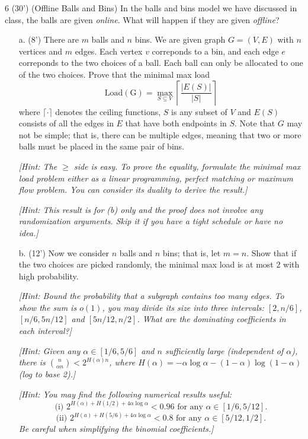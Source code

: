 
\begin{question}{6 (30') (Offline Balls and Bins)}    
In the balls and bins model we have discussed in class, the balls are given \textit{online}. What will happen if they are given \textit{offline}?
\begin{itemize}
    \item [a. (8') ] There are $m$ balls and $n$ bins. We are given graph $G=(V,E)$ with $n$ vertices and $m$ edges. Each vertex $v$ correponds to a bin, and each edge $e$ correponds to the two choices of a ball. Each ball can only be allocated to one of the two choices. Prove that the minimal max load
    $$\operatorname{Load(G)}=\max_{S\subseteq V}\left\lceil\frac{|E(S)|}{|S|}\right\rceil$$
    where $\lceil\cdot\rceil$ denotes the ceiling functions, $S$ is any subset of $V$ and $E(S)$ consists of all the edges in $E$ that have both endpoints in $S$.
    Note that $G$ may not be simple; that is, there can be multiple edges, meaning that two or more balls must be placed in the same pair of bins.

    \textit{[Hint: The $\geq$ side is easy. To prove the equality, formulate the minimal max load problem either as a linear programming, perfect matching or maximum flow problem. You can consider its duality to derive the result.]}
    
    \textit{[Hint: This result is for (b) only and the proof does not involve any randomization arguments. Skip it if you have a tight schedule or have no idea.]}
    
    \item [b. (12')] Now we consider $n$ balls and $n$ bins; that is, let $m=n$. Show that if the two choices are picked randomly, the minimal max load is at most $2$ with high probability.
    
    \textit{[Hint: Bound the probability that a subgraph contains too many edges. To show the sum is $o(1)$, you may divide its size into three intervals: $[2, n/6]$, $[n/6, 5n/12]$ and $[5n/12,n/2]$. What are the dominating coefficients in each interval?]}
    
    \textit{[Hint: Given any $\alpha\in[1/6,5/6]$ and $n$ sufficiently large (independent of $\alpha$), there is $\binom{n}{\alpha n}<2^{H(\alpha)n}$, where $H(\alpha)=-\alpha\log \alpha-(1-\alpha)\log(1-\alpha)$ (log to base 2).]}
    
    \textit{[Hint: You may find the following numerical results useful: $$\text{(i) }2^{H(\alpha)+H(1/2)+ 4\alpha\log\alpha}<0.96 \text{ for any }\alpha\in[1/6,5/12].$$ $$\text{(ii) }2^{H(a)+H(5/6)+4\alpha\log\alpha}<0.8\text{ for any }\alpha\in[5/12,1/2].$$ Be careful when simplifying the binomial coefficients.]}


\end{itemize}
\end{question}
